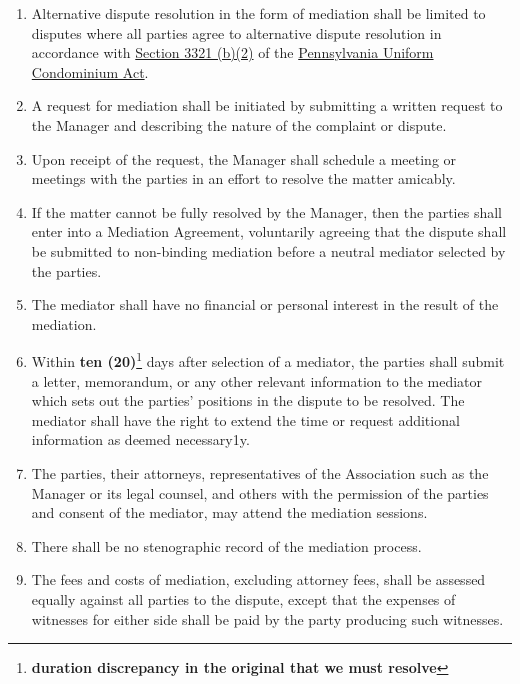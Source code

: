 \documentclass[
  14pt,
]{book}
\begin{document}
\begin{enumerate}
\def\labelenumi{\arabic{enumi}.}
\item
  Alternative dispute resolution in the form of mediation shall be limited to disputes where all parties agree to alternative dispute resolution in accordance with \href{https://www.legis.state.pa.us/cfdocs/legis/LI/consCheck.cfm?txtType=HTM\&ttl=68\&div=0\&chpt=33\&sctn=21\&subsctn=0}{Section 3321 (b)(2)} of the \href{https://www.legis.state.pa.us/cfdocs/legis/LI/consCheck.cfm?txtType=HTM\&ttl=68f}{Pennsylvania Uniform Condominium Act}.
\item
  A request for mediation shall be initiated by submitting a written request to the Manager and describing the nature of the complaint or dispute.
\item
  Upon receipt of the request, the Manager shall schedule a meeting or meetings with the parties in an effort to resolve the matter amicably.
\item
  If the matter cannot be fully resolved by the Manager, then the parties shall enter into a Mediation Agreement, voluntarily agreeing that the dispute shall be submitted to non-binding mediation before a neutral mediator selected by the parties.
\item
  The mediator shall have no financial or personal interest in the result of the mediation.
\item
  Within \textbf{ten (20)}\footnote{\textbf{duration discrepancy in the original that we must resolve}} days after selection of a mediator, the parties shall submit a letter, memorandum, or any other relevant information to the mediator which sets out the parties' positions in the dispute to be resolved. The mediator shall have the right to extend the time or request additional information as deemed necessary1y.
\item
  The parties, their attorneys, representatives of the Association such as the Manager or its legal counsel, and others with the permission of the parties and consent of the mediator, may attend the mediation sessions.
\item
  There shall be no stenographic record of the mediation process.
\item
  The fees and costs of mediation, excluding attorney fees, shall be assessed equally against all parties to the dispute, except that the expenses of witnesses for either side shall be paid by the party producing such witnesses.
\end{enumerate}
\end{document}

